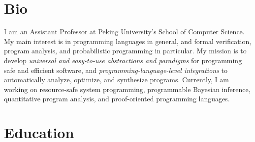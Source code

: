 \documentclass[11pt,letterpaper,roman]{moderncv}        %
\begin{document}
\makecvtitle


\section{Bio}

I am an Assistant Professor at Peking University's School of Computer Science.
%
  My main interest is in programming languages in general, and formal verification, program analysis, and probabilistic programming in particular. My mission is to develop \emph{universal and easy-to-use abstractions and paradigms} for programming safe and efficient software, and \emph{programming-language-level integrations} to automatically analyze, optimize, and synthesize programs. Currently, I am working on resource-safe system programming, programmable Bayesian inference, quantitative program analysis, and proof-oriented programming languages.

\section{Education}

  {}

  \vspace{4pt}

  {}
\end{document}
